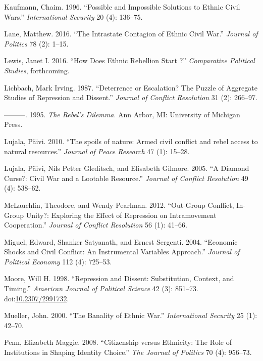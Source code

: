 \documentclass[12pt,]{book}
\theoremstyle{definition}
\theoremstyle{definition}
\theoremstyle{remark}
\begin{document}
\hypertarget{ref-Kaufmann1996b}{}
Kaufmann, Chaim. 1996. ``Possible and Impossible Solutions to Ethnic
Civil Wars.'' \emph{International Security} 20 (4): 136--75.

\hypertarget{ref-Lane2016}{}
Lane, Matthew. 2016. ``The Intrastate Contagion of Ethnic Civil War.''
\emph{Journal of Politics} 78 (2): 1--15.

\hypertarget{ref-Lewis2016}{}
Lewis, Janet I. 2016. ``How Does Ethnic Rebellion Start ?''
\emph{Comparative Political Studies}, forthcoming.

\hypertarget{ref-Lichbach1987}{}
Lichbach, Mark Irving. 1987. ``Deterrence or Escalation? The Puzzle of
Aggregate Studies of Repression and Dissent.'' \emph{Journal of Conflict
Resolution} 31 (2): 266--97.

\hypertarget{ref-Lichbach1995}{}
---------. 1995. \emph{The Rebel's Dilemma}. Ann Arbor, MI: University
of Michigan Press.

\hypertarget{ref-Lujala2010}{}
Lujala, Päivi. 2010. ``The spoils of nature: Armed civil conflict and
rebel access to natural resources.'' \emph{Journal of Peace Research} 47
(1): 15--28.

\hypertarget{ref-Lujala2005}{}
Lujala, Päivi, Nils Petter Gleditsch, and Elisabeth Gilmore. 2005. ``A
Diamond Curse?: Civil War and a Lootable Resource.'' \emph{Journal of
Conflict Resolution} 49 (4): 538--62.

\hypertarget{ref-McLauchlin2012}{}
McLauchlin, Theodore, and Wendy Pearlman. 2012. ``Out-Group Conflict,
In-Group Unity?: Exploring the Effect of Repression on Intramovement
Cooperation.'' \emph{Journal of Conflict Resolution} 56 (1): 41--66.

\hypertarget{ref-Miguel2004a}{}
Miguel, Edward, Shanker Satyanath, and Ernest Sergenti. 2004. ``Economic
Shocks and Civil Conflict: An Instrumental Variables Approach.''
\emph{Journal of Political Economy} 112 (4): 725--53.

\hypertarget{ref-Moore1998}{}
Moore, Will H. 1998. ``Repression and Dissent: Substitution, Context,
and Timing.'' \emph{American Journal of Political Science} 42 (3):
851--73. doi:\href{https://doi.org/10.2307/2991732}{10.2307/2991732}.

\hypertarget{ref-mueller00}{}
Mueller, John. 2000. ``The Banality of Ethnic War.'' \emph{International
Security} 25 (1): 42--70.

\hypertarget{ref-Penn2008}{}
Penn, Elizabeth Maggie. 2008. ``Citizenship versus Ethnicity: The Role
of Institutions in Shaping Identity Choice.'' \emph{The Journal of
Politics} 70 (4): 956--73.
\end{document}
